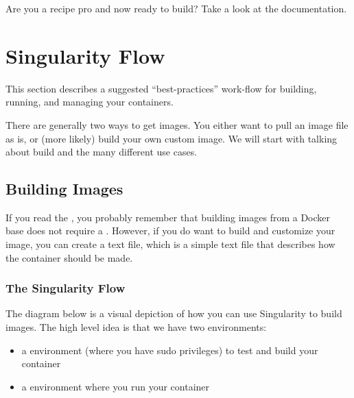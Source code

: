 \documentclass[letterpaper,10pt,english]{sphinxmanual}
\begin{document}
Are you a recipe pro and now ready to build? Take a look at the
{\hyperref[\detokenize{build_a_container:build-a-container}]{}} documentation.


\chapter{Singularity Flow}
\label{\detokenize{singularity_flow:singularity-flow}}\label{\detokenize{singularity_flow:id1}}\label{\detokenize{singularity_flow::doc}}
This section describes a suggested “best-practices” work-flow for
building, running, and managing your containers.

There are generally two ways to get images. You either want to pull an
image file as is, or (more likely) build your own custom image. We
will start with talking about build and the many different use cases.


\section{Building Images}
\label{\detokenize{singularity_flow:building-images}}\label{\detokenize{singularity_flow:sec-singularityflow}}
If you read the {\hyperref[\detokenize{quick_start:quick-start}]{}}, you probably remember that building images from a
Docker base does not require a {\hyperref[\detokenize{container_recipes:container-recipes}]{}}. However, if you do want to build and
customize your image, you can create a {\hyperref[\detokenize{container_recipes:container-recipes}]{}} text file, which is a simple
text file that describes how the container should be made.


\subsection{The Singularity Flow}
\label{\detokenize{singularity_flow:the-singularity-flow}}
The diagram below is a visual depiction of how you can use Singularity
to build images. The high level idea is that we have two environments:
\begin{itemize}
\item {} 
a  environment (where you have sudo privileges) to test and
build your container

\item {} 
a  environment where you run your container

\end{itemize}
\end{document}
